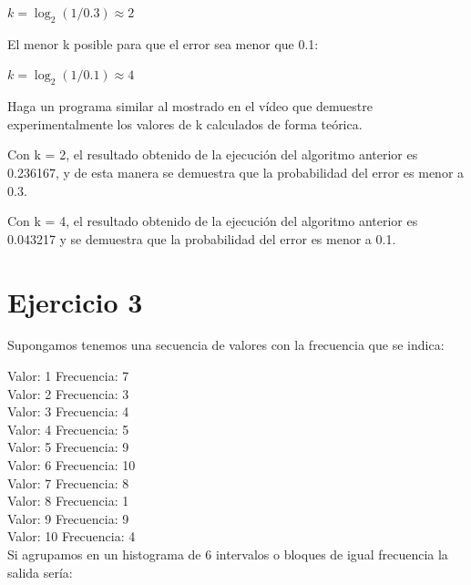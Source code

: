 \documentclass{uimppracticas}
\begin{document}
\begin{center}
	$ k = \log_2(1/0.3) \approx 2 $
\end{center}

El menor k posible para que el error sea menor que 0.1:

\begin{center}
	$ k = \log_2(1/0.1) \approx 4 $
\end{center}

Haga un programa similar al mostrado en el vídeo que demuestre experimentalmente los valores de k calculados de forma teórica.



\newpage

Con k = 2, el resultado obtenido de la ejecución del algoritmo anterior es 0.236167, y de esta manera se demuestra que la probabilidad del error es menor a 0.3.

Con k = 4, el resultado obtenido de la ejecución del algoritmo anterior es 0.043217 y se demuestra que la probabilidad del error es menor a 0.1.

\section{Ejercicio 3}

Supongamos tenemos una secuencia de valores con la frecuencia que se indica:

Valor: 1 Frecuencia: 7\\
Valor: 2 Frecuencia: 3\\
Valor: 3 Frecuencia: 4\\
Valor: 4 Frecuencia: 5\\
Valor: 5 Frecuencia: 9\\
Valor: 6 Frecuencia: 10\\
Valor: 7 Frecuencia: 8\\
Valor: 8 Frecuencia: 1\\
Valor: 9 Frecuencia: 9\\
Valor: 10 Frecuencia: 4\\

Si agrupamos en un histograma de 6 intervalos o bloques de igual frecuencia la salida sería:
\end{document}

